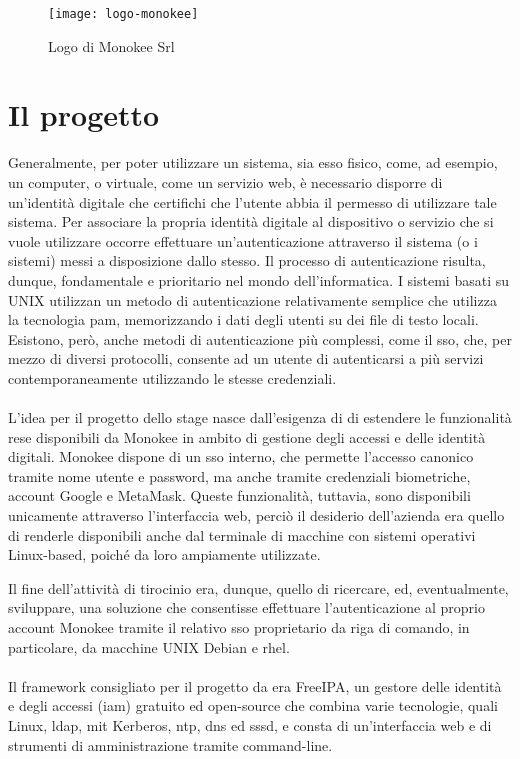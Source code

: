 \begin{figure}[H] 
    \centering 
    \texttt{[image: logo-monokee]} 
    \caption{Logo di Monokee Srl}
    \label{fig:monokee}
\end{figure}
    

\section{Il progetto}



Generalmente, per poter utilizzare un sistema, sia esso fisico, come, ad esempio, un computer, o virtuale, come un servizio web, è necessario disporre di un'identità digitale che certifichi che l'utente abbia il permesso di utilizzare tale sistema. Per associare la propria identità digitale al dispositivo o servizio che si vuole utilizzare occorre effettuare un'autenticazione attraverso il sistema (o i sistemi) messi a disposizione dallo stesso. Il processo di autenticazione risulta, dunque, fondamentale e prioritario nel mondo dell'informatica. I sistemi basati su UNIX utilizzan un metodo di autenticazione relativamente semplice che utilizza la tecnologia \acrfull{pam}, memorizzando i dati degli utenti su dei file di testo locali. Esistono, però, anche metodi di autenticazione più complessi, come il \acrfull{sso}, che, per mezzo di diversi protocolli, consente ad un utente di autenticarsi a più servizi contemporaneamente utilizzando le stesse credenziali.
\\ \\
L'idea per il progetto dello stage nasce dall'esigenza di \myAzienda{} di estendere le funzionalità rese disponibili da Monokee in ambito di gestione degli accessi e delle identità digitali.
Monokee dispone di un \acrshort{sso} interno, che permette l'accesso canonico tramite nome utente e password, ma anche tramite credenziali biometriche, account Google e MetaMask. Queste funzionalità, tuttavia, sono disponibili unicamente attraverso l'interfaccia web, perciò il desiderio dell'azienda era quello di renderle disponibili anche dal terminale di macchine con sistemi operativi Linux-based, poiché da loro ampiamente utilizzate. 

Il fine dell'attività di tirocinio era, dunque, quello di ricercare, ed, eventualmente, sviluppare, una soluzione che consentisse effettuare l'autenticazione al proprio account Monokee tramite il relativo \acrshort{sso} proprietario da riga di comando, in particolare, da macchine UNIX Debian e \acrfull{rhel}.
\\ \\
Il framework consigliato per il progetto da \myAzienda{} era FreeIPA, un gestore delle identità e degli accessi (\acrshort{iam})
gratuito ed open-source che combina varie tecnologie, quali Linux, \acrfull{ldap}, \acrfull{mit} Kerberos, \acrfull{ntp}, \acrfull{dns} ed \acrfull{sssd}, e consta di un'interfaccia web e di strumenti di amministrazione tramite command-line\cite{site:freeipa-website}. 

